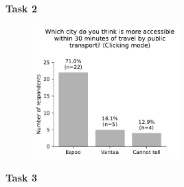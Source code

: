 \begin{appendices}
\begin{minipage}{\textwidth}
\textbf{Task 2}

\begin{figure}[H]
	\includegraphics[width=0.5\textwidth]{visual/figures/survey/2.pdf}
\end{figure}
\end{minipage}

\begin{minipage}{\textwidth}
\textbf{Task 3}


\end{minipage}
\end{appendices}
